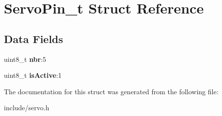 \hypertarget{structServoPin__t}{}\section{Servo\+Pin\+\_\+t Struct Reference}
\label{structServoPin__t}
\subsection*{Data Fields}
\begin{DoxyCompactItemize}
\item 
\mbox{\label{structServoPin__t_ad2ff0e34820e04a276e38d359021b03c}} 
uint8\+\_\+t {\bfseries nbr}\+:5
\item 
\mbox{\label{structServoPin__t_aaf3c1889bb99bc6f936a3cfb6eba532a}} 
uint8\+\_\+t {\bfseries is\+Active}\+:1
\end{DoxyCompactItemize}


The documentation for this struct was generated from the following file\+:\begin{DoxyCompactItemize}
\item 
include/servo.\+h\end{DoxyCompactItemize}
